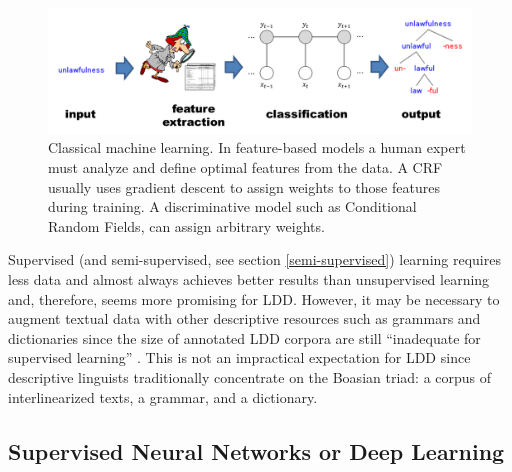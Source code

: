 \documentclass[12pt]{article}
\begin{document}
\begin{figure}[ht]
\label{fig:Features-ML}
\begin{center}
\includegraphics[width=0.95\columnwidth]{Features-ML.PNG}
\caption{Classical machine learning. In feature-based models a human expert must analyze and define optimal features from the data. A CRF usually uses gradient descent to assign weights to those features during training. A discriminative model such as Conditional Random Fields, can assign arbitrary weights.}
\end{center}
\end{figure}

Supervised (and semi-supervised, see section \ref{semi-supervised}) learning requires less data and almost always achieves better results than unsupervised learning \cite{ruokolainen_supervised_2013} and, therefore, seems more promising for LDD. However, it may be necessary to augment textual data with other descriptive resources such as grammars and dictionaries since the size of annotated LDD corpora are still ``inadequate for supervised learning'' \cite[page 18]{duong_natural_2017}. This is not an impractical expectation for LDD since descriptive linguists traditionally concentrate on the Boasian triad: a corpus of interlinearized texts, a grammar, and a dictionary.

\subsection{Supervised Neural Networks or Deep Learning}
\end{document}
